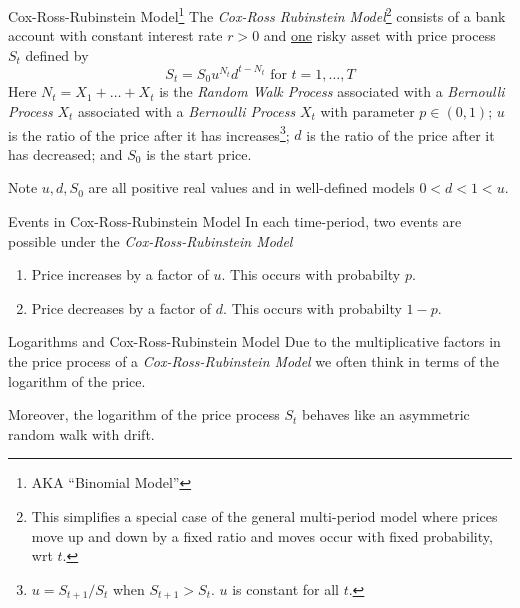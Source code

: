 \documentclass[11pt,a4paper]{article}
\begin{document}
  \begin{definition}{Cox-Ross-Rubinstein Model\footnote{AKA ``Binomial Model''}}
    The \textit{Cox-Ross Rubinstein Model}\footnote{This simplifies a special case of the general multi-period model where prices move up and down by a fixed ratio and moves occur with fixed probability, wrt $t$.} consists of a bank account with constant interest rate $r>0$ and \underline{one} risky asset with price process $S_t$ defined by
    \[ S_t=S_0u^{N_t}d^{t-N_t}\text{ for }t=1,\dots,T \]
    Here $N_t=X_1+\dots+X_t$ is the \textit{Random Walk Process} associated with a \textit{Bernoulli Process} $X_t$ associated with a \textit{Bernoulli Process} $X_t$ with parameter $p\in(0,1)$; $u$ is the ratio of the price after it has increases\footnote{$u=S_{t+1}/S_t$ when $S_{t+1}>S_t$. $u$ is constant for all $t$.}; $d$ is the ratio of the price after it has decreased; and $S_0$ is the start price.
    \par Note $u,d,S_0$ are all positive real values and in well-defined models $0<d<1<u$.
  \end{definition}

  \begin{remark}{Events in Cox-Ross-Rubinstein Model}
    In each time-period, two events are possible under the \textit{Cox-Ross-Rubinstein Model}
    \begin{enumerate}
      \item Price increases by a factor of $u$. This occurs with probabilty $p$.
      \item Price decreases by a factor of $d$. This occurs with probabilty $1-p$.
    \end{enumerate}
  \end{remark}

  \begin{remark}{Logarithms and Cox-Ross-Rubinstein Model}
    Due to the multiplicative factors in the price process of a \textit{Cox-Ross-Rubinstein Model} we often think in terms of the logarithm of the price.
    \par Moreover, the logarithm of the price process $S_t$ behaves like an asymmetric random walk with drift.
  \end{remark}
\end{document}
